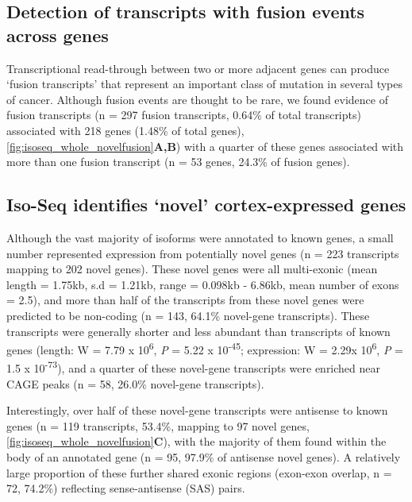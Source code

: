 \subsection{Detection of transcripts with fusion events across genes}
\label{ch4:fusion_trans}
Transcriptional read-through between two or more adjacent genes can produce ‘fusion transcripts’ that represent an important class of mutation in several types of cancer\cite{McCartney2019}. Although fusion events are thought to be rare\cite{Akiva2006a}, we found evidence of fusion transcripts (n = 297 fusion transcripts, 0.64\% of total transcripts) associated with 218 genes (1.48\% of total genes), \cref{fig:isoseq_whole_novelfusion}\textbf{A,B}) with a quarter of these genes associated with more than one fusion transcript (n = 53 genes, 24.3\% of fusion genes).

\subsection{Iso-Seq identifies ‘novel' cortex-expressed genes}
\label{sec:whole_novelgenes}
Although the vast majority of isoforms were annotated to known genes, a small number represented expression from potentially novel genes (n = 223 transcripts mapping to 202 novel genes).  These novel genes were all multi-exonic (mean length = 1.75kb, s.d = 1.21kb, range = 0.098kb - 6.86kb, mean number of exons = 2.5), and more than half of the transcripts from these novel genes were predicted to be non-coding (n = 143, 64.1\% novel-gene transcripts). These transcripts were generally shorter and less abundant than transcripts of known genes (length: W = 7.79 x 10\textsuperscript{6}, \textit{P} = 5.22 x 10\textsuperscript{-45}; expression: W = 2.29x 10\textsuperscript{6}, \textit{P} = 1.5 x 10\textsuperscript{-73}), and a quarter of these novel-gene transcripts were enriched near CAGE peaks (n = 58, 26.0\% novel-gene transcripts). 

Interestingly, over half of these novel-gene transcripts were antisense to known genes (n = 119 transcripts, 53.4\%, mapping to 97 novel genes, \cref{fig:isoseq_whole_novelfusion}\textbf{C}), with the majority of them found within the body of an annotated gene (n = 95, 97.9\% of antisense novel genes). A relatively large proportion of these further shared exonic regions (exon-exon overlap, n = 72, 74.2\%) reflecting sense-antisense (SAS) pairs. 

